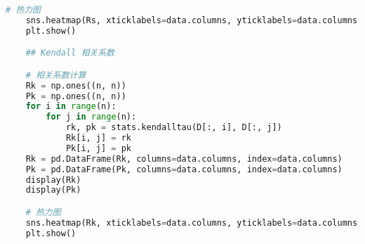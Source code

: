 \documentclass[withoutpreface]{cumcmthesis}
\begin{document}
\begin{lstlisting}[language=python ,caption={相关系数分析示例} ]
    # 热力图
    sns.heatmap(Rs, xticklabels=data.columns, yticklabels=data.columns, annot=True, cmap="jet", fmt=".4f")
    plt.show()

    ## Kendall 相关系数

    # 相关系数计算
    Rk = np.ones((n, n))
    Pk = np.ones((n, n))
    for i in range(n):
        for j in range(n):
            rk, pk = stats.kendalltau(D[:, i], D[:, j])
            Rk[i, j] = rk
            Pk[i, j] = pk
    Rk = pd.DataFrame(Rk, columns=data.columns, index=data.columns)
    Pk = pd.DataFrame(Pk, columns=data.columns, index=data.columns)
    display(Rk)
    display(Pk)

    # 热力图
    sns.heatmap(Rk, xticklabels=data.columns, yticklabels=data.columns, annot=True, cmap="jet", fmt=".4f")
    plt.show()
    \end{lstlisting}
    
\end{document}
